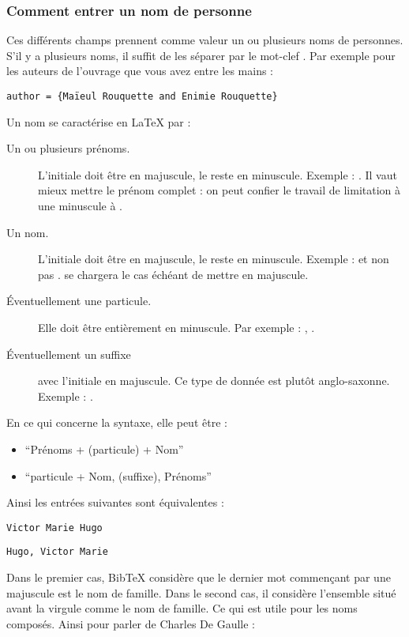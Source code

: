 \subsubsection{Comment entrer un nom de personne}

Ces différents champs prennent comme valeur un ou plusieurs noms de personnes. S'il y a plusieurs noms, il suffit de les séparer par le mot-clef . Par exemple pour les auteurs de l'ouvrage que vous avez entre les mains : 

\begin{verbatim}
author = {Maïeul Rouquette and Enimie Rouquette}
\end{verbatim}

Un nom se caractérise en LaTeX par :
\begin{description}
	\item[Un ou plusieurs prénoms.]L'initiale doit être en majuscule, le reste en minuscule. Exemple : . Il vaut mieux mettre le prénom complet : on peut confier le travail de limitation à une minuscule  à .
	\item[Un nom.]L'initiale doit être en majuscule, le reste en minuscule. Exemple :  et non pas .  se chargera le cas échéant de mettre en majuscule.
	\item[Éventuellement une particule.] Elle doit être entièrement en minuscule. Par exemple : , .
	\item[Éventuellement un suffixe] avec l'initiale en majuscule. Ce type de donnée est plutôt anglo-saxonne. Exemple : .
\end{description}

En ce qui concerne la syntaxe, elle peut être :
\begin{itemize}
\item\enquote{Prénoms + (particule) + Nom}
\item\enquote{particule + Nom, (suffixe), Prénoms} 
\end{itemize}

Ainsi les entrées suivantes sont équivalentes :

\begin{verbatim}
Victor Marie Hugo
\end{verbatim}

\begin{verbatim}
Hugo, Victor Marie
\end{verbatim}

Dans le premier cas, BibTeX considère que le dernier mot commençant par une majuscule est le nom de famille. Dans le second cas, il considère l'ensemble situé avant la virgule comme le nom de famille. Ce qui est utile pour les noms composés. Ainsi pour parler de Charles De Gaulle :

